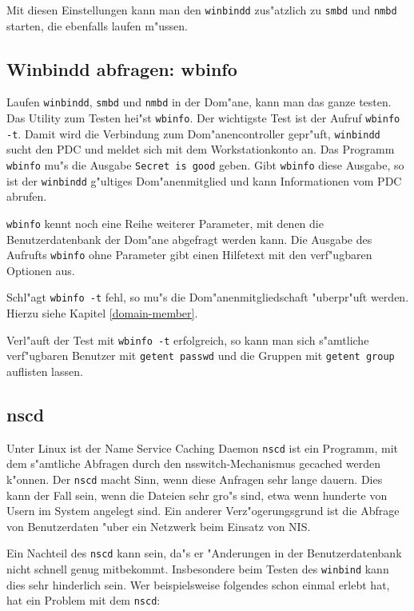\documentclass{scrartcl}\usepackage{pslatex}\typearea{12}
\newcommand{\prog}{\texttt}
\newcommand{\todo}[1]{}
\begin{document}
Mit diesen Einstellungen kann man den \prog{winbindd} zus"atzlich zu
\prog{smbd} und \prog{nmbd} starten, die ebenfalls laufen m"ussen.

\subsection{Winbindd abfragen: wbinfo}

Laufen \prog{winbindd}, \prog{smbd} und \prog{nmbd} in der Dom"ane,
kann man das ganze testen. Das Utility zum Testen hei"st
\prog{wbinfo}. Der wichtigste Test ist der Aufruf \prog{wbinfo -t}.
Damit wird die Verbindung zum Dom"anencontroller gepr"uft,
\prog{winbindd} sucht den PDC und meldet sich mit dem Workstationkonto
an. Das Programm \prog{wbinfo} mu"s die Ausgabe \texttt{Secret is
  good} geben. Gibt \prog{wbinfo} diese Ausgabe, so ist der
\prog{winbindd} g"ultiges Dom"anenmitglied und kann Informationen vom
PDC abrufen.

\prog{wbinfo} kennt noch eine Reihe weiterer Parameter, mit denen die
Benutzerdatenbank der Dom"ane abgefragt werden kann. Die Ausgabe des
Aufrufts \prog{wbinfo} ohne Parameter gibt einen Hilfetext mit den
verf"ugbaren Optionen aus.

Schl"agt \prog{wbinfo -t} fehl, so mu"s die Dom"anenmitgliedschaft
"uberpr"uft werden. Hierzu siehe Kapitel \ref{domain-member}.

Verl"auft der Test mit \prog{wbinfo -t} erfolgreich, so kann man sich
s"amtliche verf"ugbaren Benutzer mit \prog{getent passwd} und die
Gruppen mit \prog{getent group} auflisten lassen.

\todo{valid users = @DOMAIN+group}

\todo{pam\_winbind}

\subsection{nscd}
\label{nscd}

Unter Linux ist der Name Service Caching Daemon \prog{nscd} ist ein
Programm, mit dem s"amtliche Abfragen durch den nsswitch-Mechanismus
gecached werden k"onnen. Der \prog{nscd} macht Sinn, wenn diese
Anfragen sehr lange dauern. Dies kann der Fall sein, wenn die Dateien
sehr gro"s sind, etwa wenn hunderte von Usern im System angelegt sind.
Ein anderer Verz"ogerungsgrund ist die Abfrage von Benutzerdaten "uber
ein Netzwerk beim Einsatz von NIS.

Ein Nachteil des \prog{nscd} kann sein, da"s er "Anderungen in der
Benutzerdatenbank nicht schnell genug mitbekommt. Insbesondere beim
Testen des \prog{winbind} kann dies sehr hinderlich sein. Wer
beispielsweise folgendes schon einmal erlebt hat, hat ein Problem mit
dem \prog{nscd}:
\end{document}
